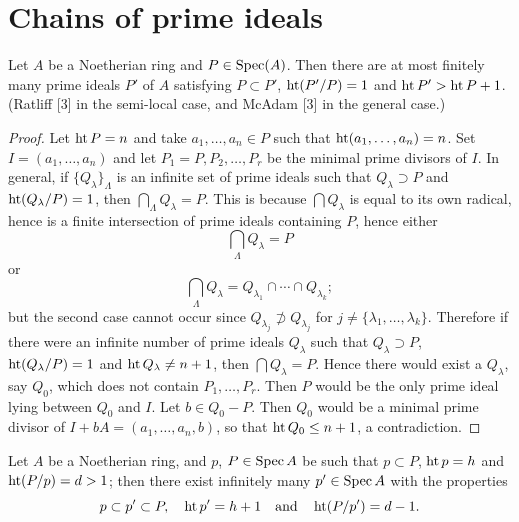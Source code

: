 \section{Chains of prime ideals}\label{sec:31}

\begin{theorem}\label{thm:31.1}
Let $A$ be a Noetherian ring and $P \in \operatorname{Spec}(A)$. Then there are at most finitely
many prime ideals $P'$ of $A$ satisfying $P \subset P'$, $\operatorname{ht}(P'/P) = 1$ and
$\operatorname{ht} P' > \operatorname{ht} P + 1$. (Ratliff [3] in the semi-local case, and McAdam [3] in
the general case.)
\end{theorem}

\begin{proof}
Let $\operatorname{ht} P = n$ and take $a_1, \ldots, a_n \in P$ such that $\operatorname{ht}(a_1, \ldots, a_n) = n$. Set
$I = (a_1, \ldots, a_n)$ and let $P_1 = P, P_2, \ldots, P_r$ be the minimal prime divisors of $I$.
In general, if $\{Q_\lambda\}_\Lambda$ is an infinite set of prime ideals such that
$Q_\lambda \supset P$ and $\operatorname{ht}(Q_\lambda/P) = 1$, then $\bigcap_\Lambda Q_\lambda = P$. This is because
$\bigcap Q_\lambda$ is equal to its own radical, hence is a finite intersection of prime
ideals containing $P$, hence either
\[
  \bigcap_\Lambda Q_\lambda = P
\]
or
\[
  \bigcap_\Lambda Q_\lambda = Q_{\lambda_1} \cap \cdots \cap Q_{\lambda_k};
\]
but the second case cannot occur since $Q_{\lambda_j} \not\supset Q_{\lambda_j}$ for
$j \ne \{\lambda_1, \ldots, \lambda_k\}$. Therefore if there were an infinite number of prime
ideals $Q_\lambda$ such that $Q_\lambda \supset P$, $\operatorname{ht}(Q_\lambda/P) = 1$ and
$\operatorname{ht} Q_\lambda \ne n + 1$, then $\bigcap Q_\lambda = P$. Hence there would exist a
$Q_\lambda$, say $Q_0$, which does not contain $P_1, \ldots, P_r$. Then $P$ would be the only
prime ideal lying between $Q_0$ and $I$. Let $b \in Q_0 - P$. Then $Q_0$ would be a
minimal prime divisor of $I + bA = (a_1, \ldots, a_n, b)$, so that
$\operatorname{ht} Q_0 \le n + 1$, a contradiction.
\end{proof}

\begin{theorem}\label{thm:31.2}
Let $A$ be a Noetherian ring, and $p$, $P \in \operatorname{Spec} A$ be such that $p \subset P$,
$\operatorname{ht} p = h$ and $\operatorname{ht}(P/p) = d > 1$; then there exist infinitely many $p' \in \operatorname{Spec} A$ with
the properties
\[
  p \subset p' \subset P, \quad \operatorname{ht} p' = h + 1 \quad \text{and} \quad \operatorname{ht}(P/p') = d - 1.
\]
\end{theorem}

